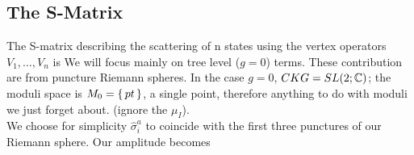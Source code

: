 \documentclass{article}
\begin{document}
\subsection{The S-Matrix}
The S-matrix describing the scattering of n states using the vertex operators $V_1, \dots, V_n$ is 
We will focus mainly on tree level ($g=0$) terms. These contribution are from puncture Riemann spheres. In the case $g=0$, $CKG = SL(2;\mathbb{C})$; the moduli space is $M_0 = \set{pt}$, a single point, therefore anything to do with moduli we just forget about. (ignore the $\mu_I$).\\
We choose for simplicity $\hat{\sigma}^a_i$ to coincide with the first three punctures of our Riemann sphere. Our amplitude becomes 
\end{document}
